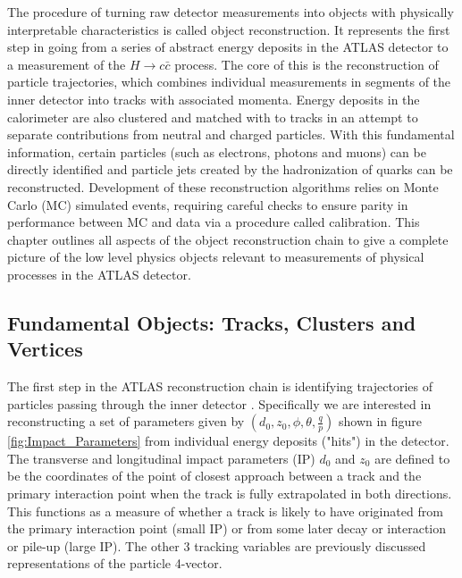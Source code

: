 The procedure of turning raw detector measurements into objects with physically interpretable characteristics is 
called object reconstruction. It represents the first step in going from a series of abstract energy deposits in 
the ATLAS detector to a measurement of the $H \rightarrow c\bar{c}$ process. The core of this is the reconstruction 
of particle trajectories, which combines individual measurements in segments of the inner detector into tracks with 
associated momenta. Energy deposits in the calorimeter are also clustered and matched with to tracks in an attempt 
to separate contributions from neutral and charged particles. With this fundamental information, certain particles 
(such as electrons, photons and muons) can be directly identified and particle jets created by the hadronization of 
quarks can be reconstructed. Development of these reconstruction algorithms relies on Monte Carlo (MC) simulated 
events, requiring careful checks to ensure parity in performance between MC and data via a procedure called 
calibration. This chapter outlines all aspects of the object reconstruction chain to give a complete picture of the 
low level physics objects relevant to measurements of physical processes in the ATLAS detector. \par

\subsection{Fundamental Objects: Tracks, Clusters and Vertices}

The first step in the ATLAS reconstruction chain is identifying trajectories of particles passing through the 
inner detector \cite{cornelissen-tracking}. Specifically we are interested in reconstructing a set of parameters 
given by $(d_0, z_0, \phi, \theta, \frac{q}{p})$ shown in figure \ref{fig:Impact_Parameters} from individual energy 
deposits ("hits") in the detector. The transverse and longitudinal impact parameters (IP) $d_0$ and $z_0$ are 
defined to be the coordinates of the point of closest approach between a track and the primary interaction point 
when the track is fully extrapolated in both directions. This functions as a measure of whether a track is likely 
to have originated from the primary interaction point (small IP) or from some later decay or interaction or pile-up 
(large IP). The other 3 tracking variables are previously discussed representations of the particle 4-vector. \par

